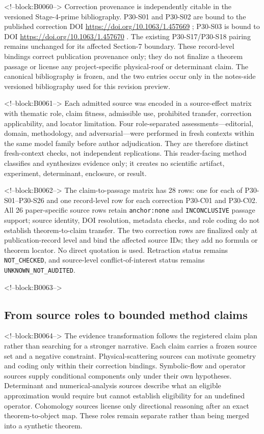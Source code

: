 \documentclass[11pt,a4paper]{article}
\begin{document}
<!--block:B0060-->
Correction provenance is independently citable in the versioned Stage-4-prime
bibliography.  P30-S01 and P30-S02 are bound to the published correction
DOI \url{https://doi.org/10.1063/1.457669} \citep{P30-C01}; P30-S03 is bound
to DOI \url{https://doi.org/10.1063/1.457670} \citep{P30-C02}.  The existing
P30-S17/P30-S18 pairing remains unchanged for its affected Section-7 boundary.
These record-level bindings correct publication provenance only; they do not
finalize a theorem passage or license any project-specific physical-roof or
determinant claim.  The canonical bibliography is frozen, and the two entries
occur only in the notes-side versioned bibliography used for this revision preview.

<!--block:B0061-->
Each admitted source was encoded in a source-effect matrix with thematic role,
claim fitness, admissible use, prohibited transfer, correction applicability,
and locator limitation.  Four role-separated assessments---editorial, domain,
methodology, and adversarial---were performed in fresh contexts within the same
model family before author adjudication.  They are therefore distinct
fresh-context checks, not independent replications.  This reader-facing method
classifies and synthesizes evidence only; it creates no scientific artifact,
experiment, determinant, enclosure, or result.

<!--block:B0062-->
The claim-to-passage matrix has 28 rows: one for each of P30-S01--P30-S26 and
one record-level row for each correction P30-C01 and P30-C02.  All 26
paper-specific source rows retain \texttt{anchor:none} and
\texttt{INCONCLUSIVE} passage support; source identity, DOI resolution, metadata
checks, and role coding do not establish theorem-to-claim transfer.  The two
correction rows are finalized only at publication-record level and bind the
affected source IDs; they add no formula or theorem locator.  No direct quotation
is used.  Retraction status remains \texttt{NOT_CHECKED}, and source-level
conflict-of-interest status remains \texttt{UNKNOWN_NOT_AUDITED}.

<!--block:B0063-->
\subsection{From source roles to bounded method claims}

<!--block:B0064-->
The evidence transformation follows the registered claim plan rather than
searching for a stronger narrative.  Each claim carries a frozen source set
and a negative constraint.  Physical-scattering sources can motivate geometry
and coding only within their correction bindings.  Symbolic-flow and operator
sources supply conditional components only under their own hypotheses.
Determinant and numerical-analysis sources describe what an eligible
approximation would require but cannot establish eligibility for an undefined
operator.  Cohomology sources license only directional reasoning after an exact
theorem-to-object map.  These roles remain separate rather than being merged
into a synthetic theorem.
\end{document}

